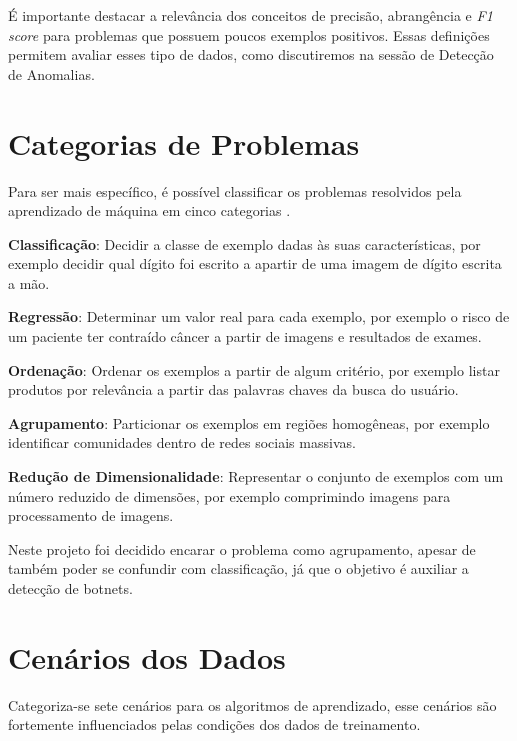 É importante destacar a relevância dos conceitos de precisão, abrangência e \textit{F1 score} para problemas que possuem poucos exemplos positivos. Essas definições permitem avaliar esses tipo de dados, como discutiremos na sessão de Detecção de Anomalias.

\section{Categorias de Problemas}

Para ser mais específico, é possível classificar os problemas resolvidos pela aprendizado de máquina em cinco categorias \citep{mohri2012foundations}.

\begin{description}
\item \textbf{Classificação}: Decidir a classe de exemplo dadas às suas características, por exemplo decidir qual dígito foi escrito a apartir de uma imagem de dígito escrita a mão.
\item \textbf{Regressão}: Determinar um valor real para cada exemplo, por exemplo o risco de um paciente ter contraído câncer a partir de imagens e resultados de exames.
\item \textbf{Ordenação}: Ordenar os exemplos a partir de algum critério, por exemplo listar produtos por relevância a partir das palavras chaves da busca do usuário.
\item \textbf{Agrupamento}: Particionar os exemplos em regiões homogêneas, por exemplo identificar comunidades dentro de redes sociais massivas.
\item \textbf{Redução de Dimensionalidade}: Representar o conjunto de exemplos com um número reduzido de dimensões, por exemplo comprimindo imagens para processamento de imagens.
\end{description}


Neste projeto foi decidido encarar o problema como agrupamento, apesar de também poder se confundir com classificação, já que o objetivo é auxiliar a detecção de botnets. 

\section{Cenários dos Dados}

Categoriza-se \citep{mohri2012foundations} sete cenários para os algoritmos de aprendizado, esse cenários são fortemente influenciados pelas condições dos dados de treinamento.

